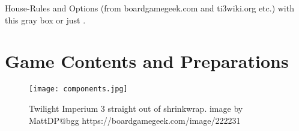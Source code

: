 \documentclass[11pt,fleqn]{book} %
\begin{document}
\begin{HRbox}
House-Rules and Options (from boardgamegeek.com and ti3wiki.org etc.) with this gray box or just .
\end{HRbox}



\section{Game Contents and Preparations}

\begin{figure}[h]
    \centering
    \texttt{[image: components.jpg]}\\
    \caption{Twilight Imperium 3 straight out of shrinkwrap. image by MattDP@bgg https://boardgamegeek.com/image/222231}
    \label{fig:game_compoments}
\end{figure}
\end{document}
